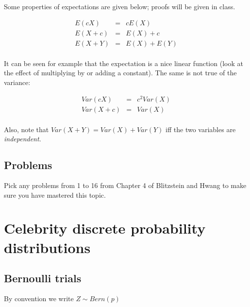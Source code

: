 \documentclass[12pt]{extbook}
\begin{document}
Some properties of expectations are given below; proofs will be given in class.

\begin{eqnarray*}
E(cX) &=& cE(X)\\
E(X + c) &=& E(X) + c\\
E(X+Y) &=& E(X) + E(Y)\\
\end{eqnarray*}

It can be seen for example that the expectation is a nice linear
function (look at the effect of multiplying by or adding a constant).
The same is not true of the variance: 

\begin{eqnarray*}
Var(cX) &=& c^2 Var(X)\\
Var(X+c) &=& Var(X) \\
\end{eqnarray*}

Also, note that $Var(X+Y) = Var(X) + Var(Y)$ iff the two variables are \emph{independent}.


\section{Problems}

\begin{enumerate}




\end{enumerate}


Pick any problems from 1 to 16 from Chapter 4 of Blitzstein and Hwang to make sure you have mastered this topic.


\chapter{Celebrity discrete probability distributions}



\section{Bernoulli trials}

{\color{green}By convention we write $Z \sim Bern(p)$}

\end{document}
